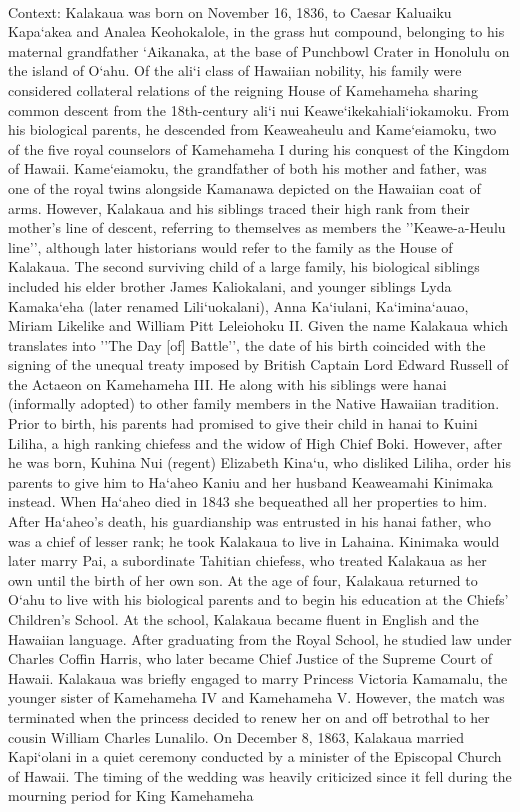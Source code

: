 \documentclass[11pt,a4paper, onecolumn]{article}
\begin{document}
\\ Context: Kalakaua was born on November 16, 1836, to Caesar Kaluaiku Kapa`akea and Analea Keohokalole, in the grass hut compound, belonging to his maternal grandfather `Aikanaka, at the base of Punchbowl Crater in Honolulu on the island of O`ahu. Of the ali`i class of Hawaiian nobility, his family were considered collateral relations of the reigning House of Kamehameha sharing common descent from the 18th-century ali`i nui Keawe`ikekahiali`iokamoku. From his biological parents, he descended from Keaweaheulu and Kame`eiamoku, two of the five royal counselors of Kamehameha I during his conquest of the Kingdom of Hawaii. Kame`eiamoku, the grandfather of both his mother and father, was one of the royal twins alongside Kamanawa depicted on the Hawaiian coat of arms. However, Kalakaua and his siblings traced their high rank from their mother's line of descent, referring to themselves as members the ''Keawe-a-Heulu line'', although later historians would refer to the family as the House of Kalakaua. The second surviving child of a large family, his biological siblings included his elder brother James Kaliokalani, and younger siblings Lyda Kamaka`eha (later renamed Lili`uokalani), Anna Ka`iulani, Ka`imina`auao, Miriam Likelike and William Pitt Leleiohoku II. Given the name Kalakaua which translates into ''The Day [of] Battle'', the date of his birth coincided with the signing of the unequal treaty imposed by British Captain Lord Edward Russell of the Actaeon on Kamehameha III. He along with his siblings were hanai (informally adopted) to other family members in the Native Hawaiian tradition. Prior to birth, his parents had promised to give their child in hanai to Kuini Liliha, a high ranking chiefess and the widow of High Chief Boki. However, after he was born, Kuhina Nui (regent) Elizabeth Kina`u, who disliked Liliha, order his parents to give him to Ha`aheo Kaniu and her husband Keaweamahi Kinimaka instead. When Ha`aheo died in 1843 she bequeathed all her properties to him. After Ha`aheo's death, his guardianship was entrusted in his hanai father, who was a chief of lesser rank; he took Kalakaua to live in Lahaina. Kinimaka would later marry Pai, a subordinate Tahitian chiefess, who treated Kalakaua as her own until the birth of her own son. At the age of four, Kalakaua returned to O`ahu to live with his biological parents and to begin his education at the Chiefs' Children's School. At the school, Kalakaua became fluent in English and the Hawaiian language. After graduating from the Royal School, he studied law under Charles Coffin Harris, who later became Chief Justice of the Supreme Court of Hawaii. Kalakaua was briefly engaged to marry Princess Victoria Kamamalu, the younger sister of Kamehameha IV and Kamehameha V. However, the match was terminated when the princess decided to renew her on and off betrothal to her cousin William Charles Lunalilo. On December 8, 1863, Kalakaua married Kapi`olani in a quiet ceremony conducted by a minister of the Episcopal Church of Hawaii. The timing of the wedding was heavily criticized since it fell during the mourning period for King Kamehameha 
\end{document}
